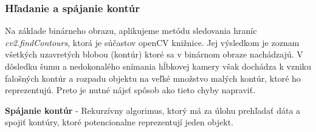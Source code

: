 \subsubsection{Hľadanie a spájanie kontúr}
Na základe binárneho obrazu, aplikujeme metódu sledovania hraníc \textit{cv2.findContours}, ktorá je súčastov openCV knižnice. Jej výsledkom je zoznam všetkých uzavretých blobou (kontúr) ktoré sa v binárnom obraze nachádzajú. V dôsledku šumu a nedokonalého snímania hĺbkovej kamery však dochádza k vzniku falošných kontúr a rozpadu objektu na veľké množstvo malých kontúr, ktoré ho reprezentujú. Preto je nutné nájsť spôsob ako tieto chyby napraviť. \vspace{5mm}

\textbf{Spájanie kontúr} - Rekurzívny algorimus, ktorý má za úlohu prehľadať dáta a spojiť kontúry, ktoré potencionalne reprezentují jeden objekt. 

